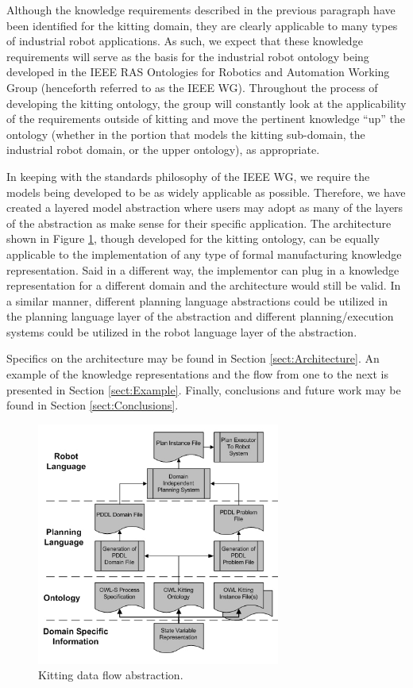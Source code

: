 Although the knowledge requirements described in the previous paragraph have been identified for the kitting domain, they are clearly applicable to many types of industrial robot applications. As such, we expect that these knowledge requirements will serve as the basis for the industrial robot ontology being developed in the IEEE  RAS Ontologies for Robotics and Automation Working Group \cite{Madhavan2011} (henceforth referred to as the IEEE WG). Throughout the process of developing the kitting ontology, the group will constantly look at the applicability of the requirements outside of kitting and move the pertinent knowledge ``up'' the ontology (whether in the portion that models the kitting sub-domain, the industrial robot domain, or the upper ontology), as appropriate.

In keeping with the standards philosophy of the IEEE WG, we require the models being developed to be as widely applicable as possible. Therefore, we have
created a layered model abstraction where users may adopt as many of the layers of the abstraction as make sense for their
specific application.  The architecture shown in Figure \ref{fig:ProcessDataFlow}, though developed for the kitting ontology, can be equally applicable to the implementation of any type of formal manufacturing knowledge representation. Said in a different way, the implementor can plug in a knowledge representation for a different domain and the architecture would still be valid. In a similar manner, different planning language abstractions could be utilized in the planning language layer of the
abstraction and different planning/execution systems could be utilized in the robot language layer of the abstraction.

Specifics on the architecture may be found in Section \ref{sect:Architecture}. An example of the
knowledge representations and the flow from one to the next is presented in Section \ref{sect:Example}. Finally,
conclusions and future work may be found in Section \ref{sect:Conclusions}.

\begin{figure}[htb]
\includegraphics[width=8cm]{images/ProcessDataFlowV2.jpg}
\caption{Kitting data flow abstraction.}
\vspace{-.15in}
\label{fig:ProcessDataFlow}
\end{figure}

